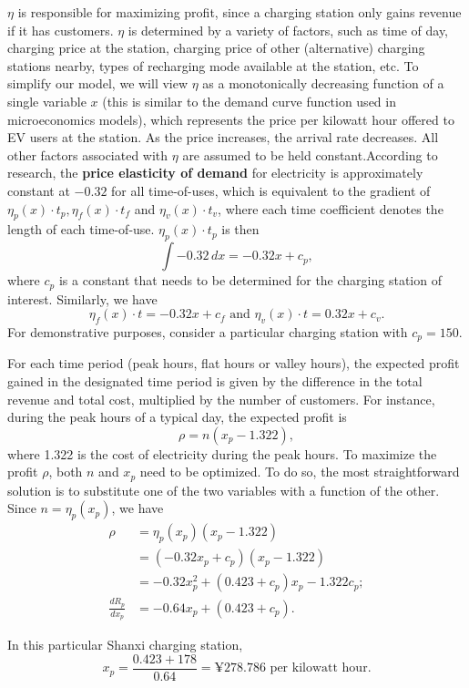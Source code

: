 \documentclass[10pt]{article}
\begin{document}
$\eta$ is responsible for maximizing profit, since a charging station only gains revenue if it has customers. $\eta$ is determined by a variety of factors, such as time of day, charging price at the station, charging price of other (alternative) charging stations nearby, types of recharging mode available at the station, etc. To simplify our model, we will view $\eta$ as a monotonically decreasing function of a single variable $x$ (this is similar to the demand curve function used in microeconomics models), which represents the price per kilowatt hour offered to EV users at the station. As the price increases, the arrival rate decreases. All other factors associated with $\eta$ are assumed to be held constant.According to research, the \textbf{price elasticity of demand} for electricity is approximately constant at $-0.32$ for all time-of-uses, which is equivalent to the gradient of $\eta_p(x) \cdot t_p,\eta_f(x) \cdot t_f$ and $\eta_v(x) \cdot t_v$, where each time coefficient denotes the length of each time-of-use. $\eta_p(x)\cdot t_p$ is then $$\int -0.32\, dx = -0.32x + c_p,$$ where $c_p$ is a constant that needs to be determined for the charging station of interest. Similarly, we have $$\eta_f(x) \cdot t = -0.32x + c_f \text{\  and \ } \eta_v(x) \cdot t = 0.32x + c_v.$$ For demonstrative purposes, consider a particular charging station with $c_p = 150$.


For each time period (peak hours, flat hours or valley hours), the expected profit gained in the designated time period is given by the difference in the total revenue and total cost, multiplied by the number of customers. For instance, during the peak hours of a typical day, the expected profit is $$\rho = n(x_p - 1.322),$$ where 1.322 is the cost of electricity during the peak hours. To maximize the profit $\rho$, both $n$ and $x_p$ need to be optimized. To do so, the most straightforward solution is to substitute one of the two variables with a function of the other. Since $n = \eta_p(x_p)$, we have
\begin{align*}
    \rho & = \eta_p(x_p)(x_p - 1.322) \\
    & = (-0.32x_p+c_p)(x_p-1.322) \\
    & = -0.32x_p^2+(0.423+c_p)x_p - 1.322c_p;\\
    \frac{dR_p}{dx_p} & = -0.64x_p+(0.423+c_p).
\end{align*}

In this particular Shanxi charging station,$$x_p = \frac{0.423+178}{0.64} = \text{¥}278.786 \text{ per kilowatt hour}.$$
\end{document}
